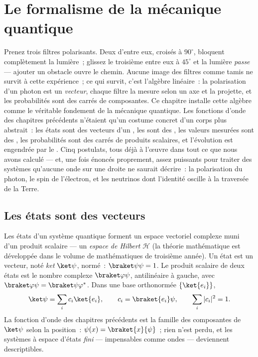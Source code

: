 \chapter{Le formalisme de la mécanique quantique}\label{ch:b3:quantum-formalism}

Prenez trois filtres polarisants. Deux d'entre eux, croisés à
$90^\circ$, bloquent complètement la lumière~; glissez le troisième
entre eux à $45^\circ$ et la lumière \emph{passe} --- ajouter un
obstacle ouvre le chemin. Aucune image des filtres comme tamis ne
survit à cette expérience~; ce qui survit, c'est l'algèbre linéaire~:
la polarisation d'un photon est un \emph{vecteur}, chaque filtre la
mesure selon un axe et la projette, et les probabilités sont des
carrés de composantes. Ce chapitre installe cette algèbre comme le
véritable fondement de la mécanique quantique. Les fonctions d'onde
des chapitres précédents n'étaient qu'un costume concret d'un corps
plus abstrait~: les états sont des vecteurs d'un ,
les  sont des , les valeurs mesurées
sont des , les probabilités sont des carrés de produits
scalaires, et l'évolution est engendrée par le . Cinq
postulats, tous déjà à l'œuvre dans tout ce que nous avons calculé ---
et, une fois énoncés proprement, assez puissants pour traiter des
systèmes qu'aucune onde sur une droite ne saurait décrire~: la
polarisation du photon, le spin de l'électron, et les neutrinos dont
l'identité oscille à la traversée de la Terre.

\section{Les états sont des vecteurs}

\begin{definition}\label{def:b3:quantum-formalism:state}
Les états d'un système quantique forment un espace vectoriel complexe
muni d'un produit scalaire --- un \emph{espace de Hilbert}
$\mathcal H$ (la théorie mathématique est développée dans le volume de
mathématiques de troisième année). Un état est un vecteur, noté
\emph{ket} $\ket\psi$, normé~: $\braket\psi\psi = 1$. Le produit
scalaire de deux états est le nombre complexe $\braket\varphi\psi$,
antilinéaire à gauche, avec $\braket\varphi\psi = \braket\psi\varphi^*$.
Dans une base orthonormée $\{\ket{e_i}\}$,
\[
\ket\psi = \sum_i c_i\ket{e_i} , \qquad
c_i = \braket{e_i}\psi , \qquad
\sum_i|c_i|^2 = 1 .
\]
La fonction d'onde des chapitres précédents est la famille des
composantes de $\ket\psi$ selon la position~: $\psi(x) =
\braket{x}{\psi}$~; rien n'est perdu, et les systèmes à espace d'états
\emph{fini} --- impensables comme ondes --- deviennent descriptibles.
\end{definition}

